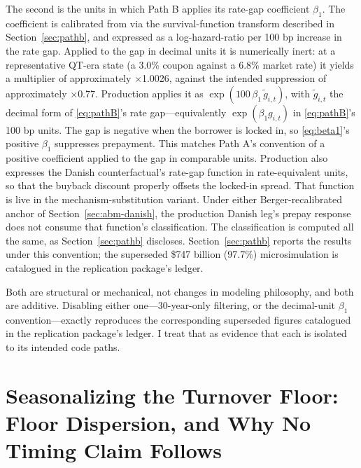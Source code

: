 \documentclass[12pt]{article}
\begin{document}
The second is the units in which Path B applies its rate-gap coefficient $\beta_1$. The coefficient is calibrated from \citet{liebersohn2024} via the survival-function transform described in Section~\ref{sec:pathb}, and expressed as a log-hazard-ratio per 100 bp increase in the rate gap. Applied to the gap in decimal units it is numerically inert: at a representative QT-era state (a 3.0\% coupon against a 6.8\% market rate) it yields a multiplier of approximately $\times$1.0026, against the intended suppression of approximately $\times$0.77. Production applies it as $\exp(100\,\beta_1\,\tilde g_{i,t})$, with $\tilde g_{i,t}$ the decimal form of \eqref{eq:pathB}'s rate gap---equivalently $\exp(\beta_1 g_{i,t})$ in \eqref{eq:pathB}'s 100 bp units. The gap is negative when the borrower is locked in, so \eqref{eq:beta1}'s positive $\beta_1$ suppresses prepayment. This matches Path A's convention of a positive coefficient applied to the gap in comparable units. Production also expresses the Danish counterfactual's rate-gap function in rate-equivalent units, so that the buyback discount properly offsets the locked-in spread. That function is live in the mechanism-substitution variant. Under either Berger-recalibrated anchor of Section~\ref{sec:abm-danish}, the production Danish leg's prepay response does not consume that function's classification. The classification is computed all the same, as Section~\ref{sec:pathb} discloses. Section~\ref{sec:pathb} reports the results under this convention; the superseded \$747 billion (97.7\%) microsimulation is catalogued in the replication package's ledger.

Both are structural or mechanical, not changes in modeling philosophy, and both are additive. Disabling either one---30-year-only filtering, or the decimal-unit $\beta_1$ convention---exactly reproduces the corresponding superseded figures catalogued in the replication package's ledger. I treat that as evidence that each is isolated to its intended code paths.

\section{Seasonalizing the Turnover Floor: Floor Dispersion, and Why No Timing Claim Follows}\label{sec:robustness-seasonalfloor}
\end{document}
